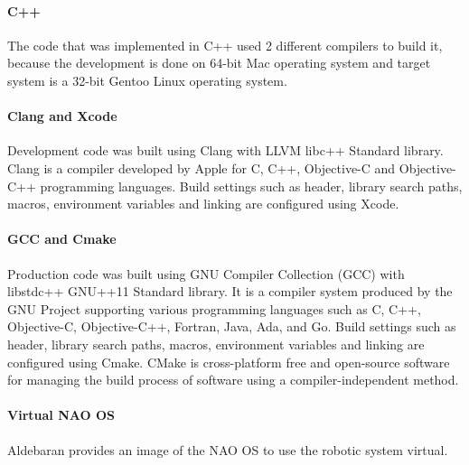 \paragraph*{C++} The code that was implemented in C++ used 2 different compilers to build it, because the development is done on 64-bit Mac operating system and target system is a 32-bit Gentoo Linux operating system. 

\paragraph*{\indent Clang and Xcode} Development code was built using Clang with LLVM libc++ Standard library. Clang is a compiler developed by Apple for C, C++, Objective-C and Objective-C++ programming languages. Build settings such as header, library search paths, macros, environment variables and linking are configured using Xcode. 

\paragraph*{\indent GCC and Cmake} Production code was built using GNU Compiler Collection (GCC) with libstdc++ GNU++11 Standard library. It is a compiler system produced by the GNU Project supporting various programming languages such as C, C++, Objective-C, Objective-C++, Fortran, Java, Ada, and Go.  Build settings such as header, library search paths, macros, environment variables and linking are configured using Cmake. CMake is cross-platform free and open-source software for managing the build process of software using a compiler-independent method.

\paragraph*{Virtual NAO OS} Aldebaran provides an image of the NAO OS to use the robotic system virtual. 


